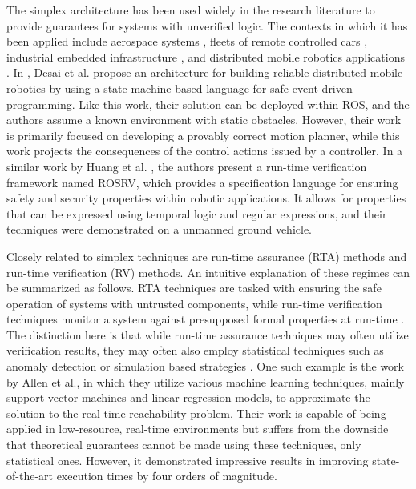 \documentclass[manuscript,screen,review]{acmart}
\begin{document}
The simplex architecture has been used widely in the research literature to provide guarantees for systems with unverified logic. The contexts in which it has been applied include aerospace systems \cite{SetoCaseStudy2000}, fleets of remote controlled cars \cite{Crenshaw2007}, industrial embedded infrastructure \cite{Bak2009Simplex,Yang2017}, and distributed mobile robotics applications \cite{Desai2018,Tran2020}. In \cite{Desai2018}, Desai et al. propose an architecture for building reliable distributed mobile robotics by using a state-machine based language for safe event-driven programming. Like this work, their solution can be deployed within ROS, and the authors assume a known environment with static obstacles. However, their work is primarily focused on developing a provably correct motion planner, while this work projects the consequences of the control actions issued by a controller. In a similar work by Huang et al. \cite{Huang2014}, the authors present a run-time verification framework named ROSRV, which provides a specification language for ensuring safety and security properties within robotic applications. It allows for properties that can be expressed using temporal logic and regular expressions, and their techniques were demonstrated on a unmanned ground vehicle.

Closely related to simplex techniques are run-time assurance (RTA) methods and run-time verification (RV) methods. An intuitive explanation of these regimes can be summarized as follows. RTA techniques are tasked with ensuring the safe operation of systems with untrusted components, while run-time verification techniques monitor a system against presupposed formal properties at run-time \cite{PETTERSSON200573,DesaiRV2017,Deshmukh2015,Masson2018,Akametalu2014,mitsch,Daws1998,Phan2020}. The distinction here is that while run-time assurance techniques may often utilize verification results, they may often also employ statistical techniques such as anomaly detection \cite{boursinos2020trusted} or simulation based strategies \cite{Clark2013}. One such example is the work by Allen et al.\cite{Allen2014}, in which they utilize various machine learning techniques, mainly support vector machines and linear regression models, to approximate the solution to the real-time reachability problem. Their work is capable of being applied in low-resource, real-time environments but suffers from the downside that theoretical guarantees cannot be made using these techniques, only statistical ones. However, it demonstrated impressive results in improving state-of-the-art execution times by four orders of magnitude.
\end{document}

